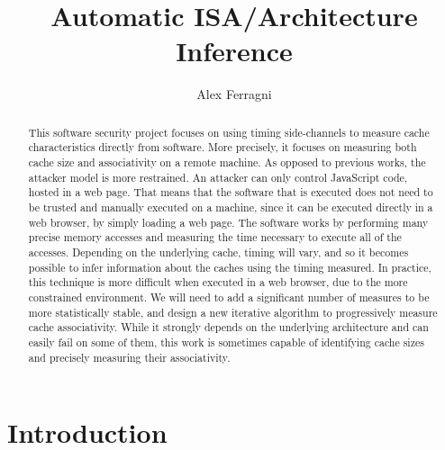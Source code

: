 \documentclass[a4paper,11pt,oneside]{report}
\title{Automatic ISA/Architecture Inference}
\author{Alex Ferragni}
\begin{document}
\maketitle

\begin{abstract}

This software security project focuses on using timing side-channels to measure cache characteristics directly from software. More precisely, it focuses on measuring both cache size and associativity on a remote machine. As opposed to previous works, the attacker model is more restrained. An attacker can only control JavaScript code, hosted in a web page. That means that the software that is executed does not need to be trusted and manually executed on a machine, since it can be executed directly in a web browser, by simply loading a web page. The software works by performing many precise memory accesses and measuring the time necessary to execute all of the accesses. Depending on the underlying cache, timing will vary, and so it becomes possible to infer information about the caches using the timing measured. In practice, this technique is more difficult when executed in a web browser, due to the more constrained environment. We will need to add a significant number of measures to be more statistically stable, and design a new iterative algorithm to progressively measure cache associativity. While it strongly depends on the underlying architecture and can easily fail on some of them, this work is sometimes capable of identifying cache sizes and precisely measuring their associativity.

\end{abstract}


\maketoc

\chapter{Introduction}
\end{document}
